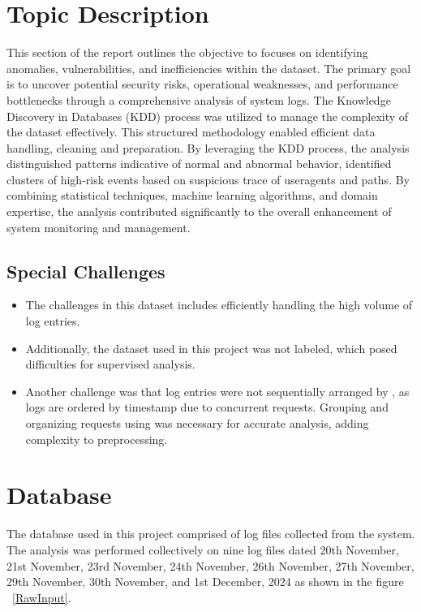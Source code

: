 \section{Topic Description}
This section of the report outlines the objective to focuses on identifying anomalies, vulnerabilities, and inefficiencies within the dataset. The primary goal is to uncover potential security risks, operational weaknesses, and performance bottlenecks through a comprehensive analysis of system logs.
The Knowledge Discovery in Databases (KDD) process was utilized to manage the complexity of the dataset effectively. This structured methodology enabled efficient data handling, cleaning and preparation. By leveraging the KDD process, the analysis distinguished patterns indicative of normal and abnormal behavior, identified clusters of high-risk events based on suspicious trace of useragents and paths.
By combining statistical techniques, machine learning algorithms, and domain expertise, the analysis contributed significantly to the overall enhancement of system monitoring and management.

\subsection{Special Challenges}

\begin{itemize}
	\item The challenges in this dataset includes efficiently handling the high volume of log entries.
	\item  Additionally, the dataset used in this project was not labeled, which posed difficulties for supervised analysis.
	\item Another challenge was that log entries were not sequentially arranged by , as logs are ordered by timestamp due to concurrent requests. Grouping and organizing requests using  was necessary for accurate analysis, adding complexity to preprocessing.
	
\end{itemize}

\section{Database}

The database used in this project comprised of log files collected from the system. The analysis was performed collectively on nine log files dated 20th November, 21st November, 23rd November, 24th November, 26th November, 27th November, 29th November, 30th November, and 1st December, 2024 as shown in the figure ~\ref{RawInput}.

